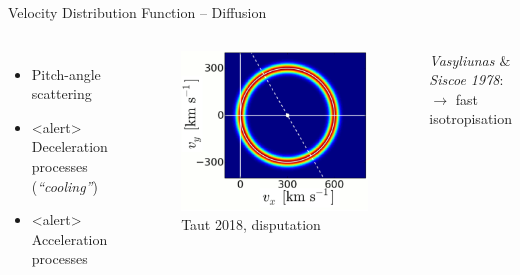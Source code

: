 \documentclass{beamer}
\begin{document}
\begin{frame}{Velocity Distribution Function -- Diffusion} %
\begin{columns}
	\column{5cm}
		\begin{itemize}
			\item Pitch-angle scattering 
			\vspace{1cm}
			\item<alert> Deceleration processes (\textit{``cooling''})
			\vspace{1cm}
			\item<alert> Acceleration processes
		\end{itemize}
	\column{7.5cm}
		\begin{figure}
			\includegraphics[scale=0.26]{pictures/pa.png}
			\caption{\tiny{Taut 2018, disputation}}
		\end{figure}
\begin{center}
	   \textit{Vasyliunas $\&$ Siscoe 1978}: \\$\rightarrow$ fast isotropisation
\end{center}
\end{columns}
\end{frame}
\end{document}
